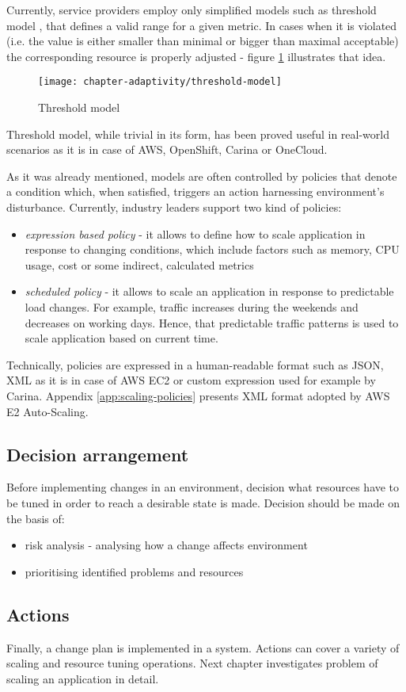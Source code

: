 Currently, service providers employ only simplified models such as threshold model \cite{LiWoZh05}, that defines a valid range for a given metric. In cases when it is violated (i.e. the value is either smaller than minimal or bigger than maximal acceptable) the corresponding resource is properly adjusted - figure \ref{fig:threshold-model} illustrates that idea.

\begin{figure}[!ht]
  \begin{center}
    \texttt{[image: chapter-adaptivity/threshold-model]}
  \end{center}
  \caption{Threshold model}
  \label{fig:threshold-model}
\end{figure}

Threshold model, while trivial in its form, has been proved useful in real-world scenarios as it is in case of AWS, OpenShift, Carina or OneCloud.

As it was already mentioned, models are often controlled by policies that denote a condition which, when satisfied, triggers an action harnessing environment's disturbance. Currently, industry leaders support \cite{AmazonAutoScaling} two kind of policies:

\begin{itemize}
 \item \textit{expression based policy} - it allows to define how to scale application in response to changing conditions, which include factors such as memory, CPU usage, cost or some indirect, calculated metrics
 \item \textit{scheduled policy} - it allows to scale an application in response to predictable load changes. For example, traffic increases during the weekends and decreases on working days. Hence, that predictable traffic patterns is used to scale application based on current time.
\end{itemize}

Technically, policies are expressed in a human-readable format such as JSON, XML as it is in case of AWS EC2 or custom expression used for example by Carina. Appendix \ref{app:scaling-policies} presents XML format adopted by AWS E2 Auto-Scaling.

\subsection{Decision arrangement}
Before implementing changes in an environment, decision what resources have to be tuned in order to reach a desirable state is made. Decision should be made on the basis of:
\begin{itemize}
 \item risk analysis - analysing how a change affects environment
 \item prioritising identified problems and resources
\end{itemize}

\subsection{Actions}
Finally, a change plan is implemented in a system. Actions can cover a variety of scaling and resource tuning operations. Next chapter investigates problem of scaling an application in detail.
